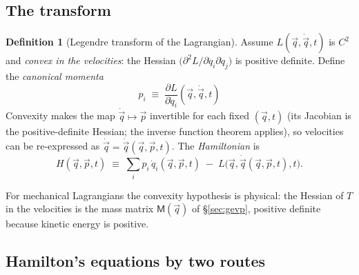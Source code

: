 \documentclass[11pt]{article}
\theoremstyle{plain}
\theoremstyle{definition}
\newtheorem{definition}[theorem]{Definition}
\theoremstyle{remark}
\newcommand{\pd}[2]{\frac{\partial #1}{\partial #2}}
\newcommand{\vq}{\vec{q}}
\newcommand{\vp}{\vec{p}}
\newcommand{\mM}{\mathsf{M}}
\begin{document}
\subsection{The transform}
\label{sec:legendre}

\begin{definition}[Legendre transform of the Lagrangian]
\label{def:legendre}
Assume $L(\vq, \dot\vq, t)$ is $C^2$ and \emph{convex in the velocities}:
the Hessian $\bigl(\partial^2 L/\partial\dot q_i\partial\dot q_j\bigr)$ is
positive definite. Define the \emph{canonical momenta}
\begin{equation}
  \boxed{\;p_i \;\equiv\; \pd{L}{\dot q_i}(\vq, \dot\vq, t)\;}
  \label{eq:canonical-momentum}
\end{equation}
Convexity makes the map $\dot\vq \mapsto \vp$ invertible for each fixed
$(\vq, t)$ (its Jacobian is the positive-definite Hessian; the inverse
function theorem applies), so velocities can be re-expressed as
$\dot\vq = \dot\vq(\vq, \vp, t)$. The \emph{Hamiltonian} is
\begin{equation}
  \boxed{\;
  H(\vq, \vp, t)
  \;\equiv\;
  \sum_i p_i\,\dot q_i(\vq,\vp,t) \;-\; L\bigl(\vq, \dot\vq(\vq,\vp,t), t\bigr).
  \;}
  \label{eq:hamiltonian}
\end{equation}
\end{definition}

For mechanical Lagrangians the convexity hypothesis is physical: the
Hessian of $T$ in the velocities is the mass matrix $\mM(\vq)$ of
\S\ref{sec:gevp}, positive definite because kinetic energy is positive.

\subsection{Hamilton's equations by two routes}
\label{sec:hamilton-eqs}
\end{document}
